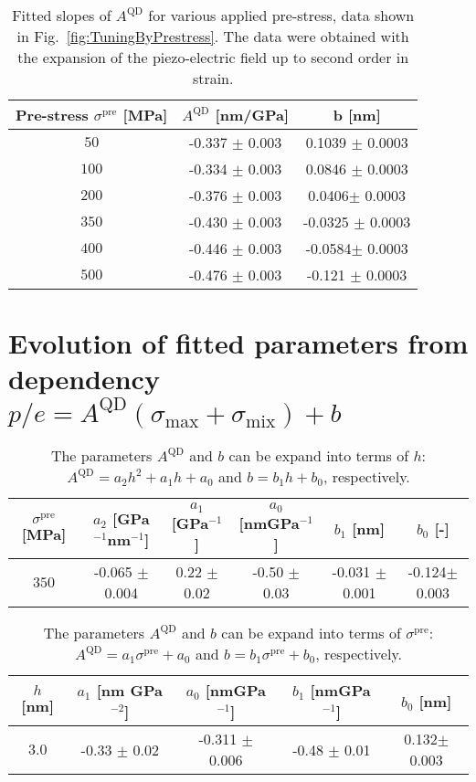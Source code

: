  		\begin{table}[ht!]
 			\centering
 			\caption{Fitted slopes of $A^{\mathrm{QD}}$ for various applied pre-stress, data shown in Fig.~\ref{fig:TuningByPrestress}. The data were obtained with the expansion of the piezo-electric field up to second order in strain.}
 			\label{tab:prestress_slopes}
 			\begin{tabular}{|c|c|c|}
 				\hline
 				Pre-stress $\sigma^\mathrm{pre}$ [MPa]		& $A^{\mathrm{QD}}$ [nm/GPa]    & b   [nm]    \\ \hline
 				$50$  &-0.337 $\pm$ 0.003  & 0.1039 $\pm$ 0.0003     \\ \hline
 				$100$	&-0.334 $\pm$ 0.003  & 0.0846 $\pm$ 0.0003      \\ \hline
 				$200$  &-0.376 $\pm$ 0.003  & 0.0406$\pm$ 0.0003     \\ \hline
 				$350$	&-0.430 $\pm$ 0.003  & -0.0325 $\pm$ 0.0003      \\ \hline
 				$400$  &-0.446 $\pm$ 0.003  & -0.0584$\pm$ 0.0003    \\ \hline
 				$500$	&-0.476 $\pm$ 0.003  & -0.121 $\pm$ 0.0003      \\ \hline
 			\end{tabular}    
 		\end{table}
 		
\newpage
\section*{Evolution of fitted parameters from dependency $p/e = A^\mathrm{QD} \left(\sigma_\mathrm{max}+\sigma_\mathrm{mix}\right) + b$}
%
 		\begin{table}[ht!]
 			\centering
 			\caption{The parameters $A^\mathrm{QD}$ and $b$ can be expand into terms of $h$: $A^\mathrm{QD}=a_2h^2+a_1h+a_0$ and $b=b_1h+b_0$, respectively.}
 			\label{tab:height_fit}
 			\begin{tabular}{|c|c|c|c||c|c|}
 				\hline
 				 $\sigma^\mathrm{pre}$ [MPa]		& $a_2$ [GPa$^{-1}$nm$^{-1}$]    & $a_1$   [GPa$^{-1}$]  &$a_0$ [nmGPa$^{-1}$] & $b_1$ [nm] & $b_0$ [-] \\ \hline
 				$350$  &-0.065 $\pm$ 0.004  & 0.22 $\pm$ 0.02  &  -0.50 $\pm$ 0.03 & -0.031 $\pm$ 0.001 & -0.124$\pm$0.003 \\ \hline
 			\end{tabular}    
 		\end{table}
 		
 		
 		\begin{table}[ht!]
 			\centering
 			\caption{The parameters $A^\mathrm{QD}$ and $b$ can be expand into terms of $\sigma^\mathrm{pre}$: $A^\mathrm{QD}=a_1\sigma^\mathrm{pre}+a_0$ and $b=b_1\sigma^\mathrm{pre}+b_0$, respectively.}
 			\label{tab:prestress_fit}
 			\begin{tabular}{|c|c|c||c|c|}
 				\hline
 				$h$ [nm]		   & $a_1$   [nm GPa$^{-2}$]  &$a_0$ [nmGPa$^{-1}$] & $b_1$ [nmGPa$^{-1}$] & $b_0$ [nm] \\ \hline
 				$3.0$   & -0.33 $\pm$ 0.02  &  -0.311 $\pm$ 0.006 & -0.48 $\pm$ 0.01 & 0.132$\pm$0.003 \\ \hline
 			\end{tabular}    
 		\end{table}
